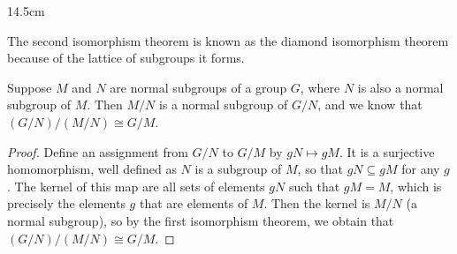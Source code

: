 \begin{wrapfigure}{1}{4.5cm}
\end{wrapfigure}

The second isomorphism theorem is known as the diamond isomorphism theorem because of the lattice of subgroups it forms.

\begin{theorem} 
    Suppose $M$ and $N$ are normal subgroups of a group $G$, where $N$ is also a normal subgroup of $M$. Then $M/N$ is a normal subgroup of $G/N$, and we know that $(G/N)/(M/N) \cong G/M$.
\end{theorem}
\begin{proof}
    Define an assignment from $G/N$ to $G/M$ by $gN \mapsto gM$. It is a surjective homomorphism, well defined as $N$ is a subgroup of $M$, so that $gN \subseteq gM$ for any $g$. The kernel of this map are all sets of elements $gN$ such that $gM = M$, which is precisely the elements $g$ that are elements of $M$. Then the kernel is $M/N$ (a normal subgroup), so by the first isomorphism theorem, we obtain that $(G/N)/(M/N) \cong G/M$.
\end{proof}

